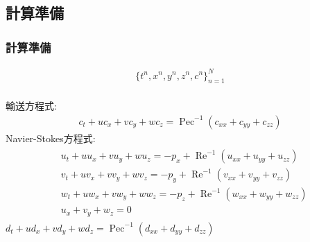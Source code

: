 \documentclass[xcolor=dvipsnames,hyperref={breaklinks=true},mathserif,professionalfont,dvipdfmx,12pt]{beamer}
\begin{document}
\subsection{計算準備}
\begin{frame}
  \frametitle{計算準備}
 \begin{align*}
  \{t^n,x^n,y^n,z^n, c^n\}_{n=1}^{N}
 \end{align*}
  \\
    \small 輸送方程式:\normalsize
    \begin{align*}
      c_{t}+u c_{x}+v c_{y}+w c_{z}=\operatorname{Pec}^{-1}\left(c_{x x}+c_{y y}+c_{z z}\right)
    \end{align*}
    \small Navier-Stokes方程式:\normalsize
    \footnotesize
    \begin{align*}
      \begin{aligned}
      &u_{t}+u u_{x}+v u_{y}+w u_{z}=-p_{x}+\operatorname{Re}^{-1}\left(u_{x x}+u_{y y}+u_{z z}\right) \\
      &v_{t}+u v_{x}+v v_{y}+w v_{z}=-p_{y}+\operatorname{Re}^{-1}\left(v_{x x}+v_{y y}+v_{z z}\right) \\
      &w_{t}+u w_{x}+v w_{y}+w w_{z}=-p_{z}+\operatorname{Re}^{-1}\left(w_{x x}+w_{y y}+w_{z z}\right) \\
      &u_{x}+v_{y}+w_{z}=0
    \end{aligned}
    \end{align*}
    \normalsize
    \small {}\normalsize \footnotesize$d_{t}+u d_{x}+v d_{y}+w d_{z}=\operatorname{Pec}^{-1}\left(d_{x x}+d_{y y}+d_{z z}\right)$\normalsize
\end{frame}
\end{document}
